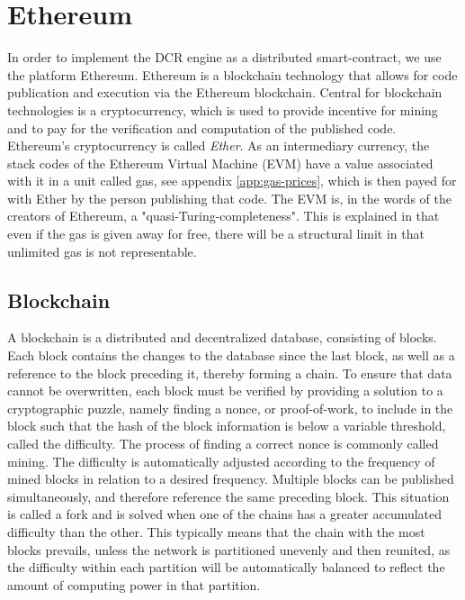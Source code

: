 \documentclass{article}
\begin{document}
	\section{Ethereum}
		In order to implement the DCR engine as a distributed smart-contract, we use the platform Ethereum. 
		Ethereum is a blockchain technology that allows for code publication and execution via the Ethereum blockchain.  
		Central for blockchain technologies is a cryptocurrency, which is used to provide incentive for mining and to pay for the verification and computation of the published code.
		Ethereum's cryptocurrency is called \emph{Ether}.
		As an intermediary currency, the stack codes of the Ethereum Virtual Machine (EVM) have a value associated with it in a unit called gas, see appendix \ref{app:gas-prices}, which is then payed for with Ether by the person publishing that code.
		The EVM is, in the words of the creators of Ethereum, a "quasi-Turing-completeness"\cite{yellow-paper}.
		This is explained in that even if the gas is given away for free, there will be a structural limit in that unlimited gas is not representable.

		\subsection{Blockchain}
		\label{sec:blockchain}
		A blockchain is a distributed and decentralized database, consisting of blocks\cite{bitcoin-white-paper}. 
		Each block contains the changes to the database since the last block, as well as a reference to the block preceding it, thereby forming a chain.
		To ensure that data cannot be overwritten, each block must be verified by providing a solution to a cryptographic puzzle, namely finding a nonce, or proof-of-work, to include in the block such that the hash of the block information is below a variable threshold, called the difficulty\cite{bitcoin-white-paper}. 
		The process of finding a correct nonce is commonly called mining.
		The difficulty is automatically adjusted according to the frequency of mined blocks in relation to a desired frequency.
		Multiple blocks can be published simultaneously, and therefore reference the same preceding block. This situation is called a fork and is solved when one of the chains has a greater accumulated difficulty than the other.
		This typically means that the chain with the most blocks prevails, unless the network is partitioned unevenly and then reunited, as the difficulty within each partition will be automatically balanced to reflect the amount of computing power in that partition.
\end{document}
